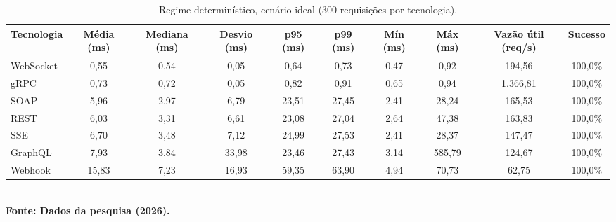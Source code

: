 \begin{table}[H]
\centering
\scriptsize
\caption{Regime determinístico, cenário ideal (300 requisições por tecnologia).}
\label{tab:det_ideal}
\begin{tabular}{|l|c|c|c|c|c|c|c|c|c|}
\hline
\textbf{Tecnologia} & \textbf{Média (ms)} & \textbf{Mediana (ms)} & \textbf{Desvio (ms)} & \textbf{p95 (ms)} & \textbf{p99 (ms)} & \textbf{Mín (ms)} & \textbf{Máx (ms)} & \textbf{Vazão útil (req/s)} & \textbf{Sucesso} \\ \hline
WebSocket & 0,55 & 0,54 & 0,05 & 0,64 & 0,73 & 0,47 & 0,92 & 194,56 & 100,0\% \\ \hline
gRPC & 0,73 & 0,72 & 0,05 & 0,82 & 0,91 & 0,65 & 0,94 & 1.366,81 & 100,0\% \\ \hline
SOAP & 5,96 & 2,97 & 6,79 & 23,51 & 27,45 & 2,41 & 28,24 & 165,53 & 100,0\% \\ \hline
REST & 6,03 & 3,31 & 6,61 & 23,08 & 27,04 & 2,64 & 47,38 & 163,83 & 100,0\% \\ \hline
SSE & 6,70 & 3,48 & 7,12 & 24,99 & 27,53 & 2,41 & 28,37 & 147,47 & 100,0\% \\ \hline
GraphQL & 7,93 & 3,84 & 33,98 & 23,46 & 27,43 & 3,14 & 585,79 & 124,67 & 100,0\% \\ \hline
Webhook & 15,83 & 7,23 & 16,93 & 59,35 & 63,90 & 4,94 & 70,73 & 62,75 & 100,0\% \\ \hline
\end{tabular}
{\footnotesize\\ \textbf{Fonte: Dados da pesquisa (2026).}}
\end{table}

